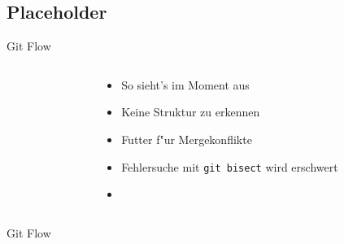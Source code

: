 \documentclass{beamer}
\begin{document}
\subsection{Placeholder}
\begin{frame}{Git Flow}
	\begin{columns}[T] %
		\begin{column}{.2\textwidth}
			\resizebox{!}{.8\textheight}{
					
			}
		\end{column}
		\hfill
		\begin{column}{.8\textwidth}
			\vfill
			\begin{itemize}
				\item<1-> So sieht's im Moment aus
				\item<1-> Keine Struktur zu erkennen
				\item<1-> Futter f"ur Mergekonflikte
				\item<1-> Fehlersuche mit \texttt{git bisect} wird erschwert
				\item<2->[] 
			\end{itemize}
		\end{column}
	\end{columns}
\end{frame}

\begin{frame}{Git Flow}
	\begin{center}
		\resizebox{!}{.8\textheight}{
			
		}
	\end{center}
\end{frame}
\end{document}
